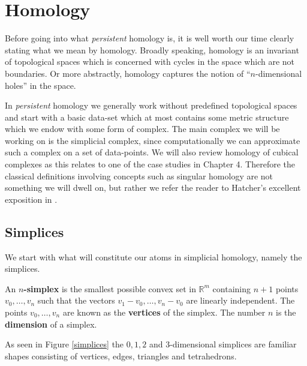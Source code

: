 \chapter{Homology}
Before going into what \textit{persistent} homology is, it is well worth our time clearly stating what we mean by homology. Broadly speaking, homology is an invariant of topological spaces which is concerned with cycles in the space which are not boundaries. Or more abstractly, homology captures the notion of ``$n$-dimensional holes'' in the space.

In \textit{persistent} homology we generally work without predefined topological spaces and start with a basic data-set which at most contains some metric structure which we endow with some form of complex. The main complex we will be working on is the simplicial complex, since computationally we can approximate such a complex on a set of data-points. We will also review homology of cubical complexes as this relates to one of the case studies in Chapter 4. Therefore the classical definitions involving concepts such as singular homology are not something we will dwell on, but rather we refer the reader to Hatcher's excellent exposition in \cite{hatcher2002}.


\section{Simplices}
We start with what will constitute our atoms in simplicial homology, namely the simplices.
\begin{definition}
An \textbf{$n$-simplex} is the smallest possible convex set in $\mathbb{R}^{m}$ containing $n+1$ points $v_{0},\dots,v_{n}$ such that the vectors $v_{1}-v_{0}, \dots, v_{n} - v_{0}$ are linearly independent. The points $v_{0},\dots,v_{n}$ are known as the \textbf{vertices} of the simplex. The number $n$ is the \textbf{dimension} of a simplex.
\end{definition}
As seen in Figure \ref{simplices} the $0,1,2$ and $3$-dimensional simplices are familiar shapes consisting of vertices, edges, triangles and tetrahedrons.

